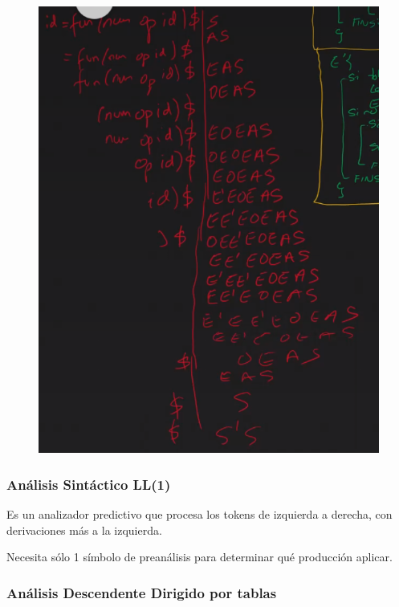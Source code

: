 \documentclass[12pt]{report} %
\begin{document}
\begin{figure}[H]
	{\includegraphics[scale=.7]{2021-03-26 17_50_51-Ejercicio descendente recursivo.png}}
\end{figure}

\pagebreak

\subsubsection{Análisis Sintáctico LL(1)}

Es un analizador predictivo que procesa los tokens de izquierda a
derecha, con derivaciones más a la izquierda.

Necesita sólo 1 símbolo de preanálisis para determinar qué producción
aplicar.


\subsubsection{Análisis Descendente Dirigido por tablas}
\end{document}
